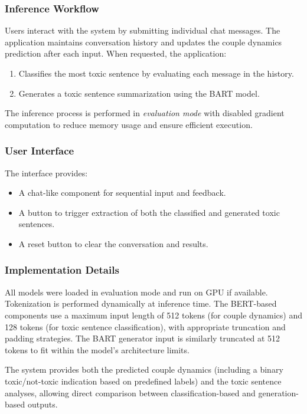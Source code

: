\documentclass[conference]{IEEEtran}
\begin{document}
\subsubsection{Inference Workflow}
Users interact with the system by submitting individual chat messages. The application maintains conversation history and updates the couple dynamics prediction after each input. When requested, the application:
\begin{enumerate}
    \item Classifies the most toxic sentence by evaluating each message in the history.
    \item Generates a toxic sentence summarization using the BART model.
\end{enumerate}
The inference process is performed in \emph{evaluation mode} with disabled gradient computation to reduce memory usage and ensure efficient execution.

\subsubsection{User Interface}
The interface provides:
\begin{itemize}
    \item A chat-like component for sequential input and feedback.
    \item A button to trigger extraction of both the classified and generated toxic sentences.
    \item A reset button to clear the conversation and results.
\end{itemize}

\subsubsection{Implementation Details}
All models were loaded in evaluation mode and run on GPU if available. Tokenization is performed dynamically at inference time. The BERT-based components use a maximum input length of 512 tokens (for couple dynamics) and 128 tokens (for toxic sentence classification), with appropriate truncation and padding strategies. The BART generator input is similarly truncated at 512 tokens to fit within the model's architecture limits.

The system provides both the predicted couple dynamics (including a binary toxic/not-toxic indication based on predefined labels) and the toxic sentence analyses, allowing direct comparison between classification-based and generation-based outputs.
\end{document}
